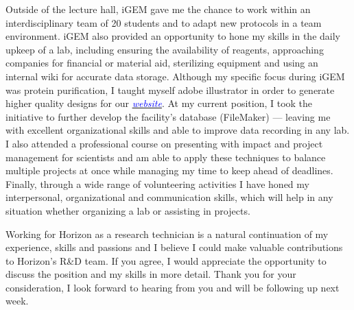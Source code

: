 \documentclass[11pt,a4paper,sans]{moderncv}
\begin{document}
\begin{spacing}{1.15}
Outside of the lecture hall, iGEM gave me the chance to work within an interdisciplinary team of 20 students and to adapt new protocols in a team environment. iGEM also provided an opportunity to hone my skills in the daily upkeep of a lab, including ensuring the availability of reagents, approaching companies for financial or material aid, sterilizing equipment and using an internal wiki for accurate data storage. Although my specific focus during iGEM was protein purification, I taught myself adobe illustrator in order to generate higher quality designs for our {\href{http://2015.igem.org/Team:Freiburg}{\textcolor{blue}{\textit{website}}}}. At my current position, I took the initiative to further develop the facility's database (FileMaker)  --- leaving me with excellent organizational skills and able to improve data recording in any lab. I also attended a professional course on presenting with impact and project management for scientists and am able to apply these techniques to balance multiple projects at once while managing my time to keep ahead of deadlines. Finally, through a wide range of volunteering activities I have honed my interpersonal, organizational and communication skills, which will help in any situation whether organizing a lab or assisting in projects.\par\vspace*{2mm}

Working for Horizon as a research technician is a natural continuation of my experience, skills and passions and I believe I could make valuable contributions to Horizon's R\&D team. If you agree, I would appreciate the opportunity to discuss the position and my skills in more detail. Thank you for your consideration, I look forward to hearing from you and will be following up next week.

\end{spacing}
\vspace*{2mm} 
\makeletterclosing
\end{document}
